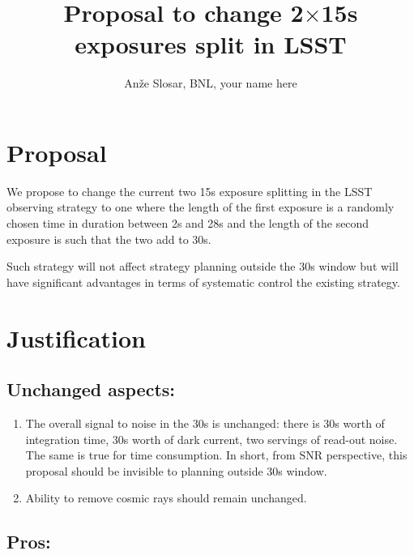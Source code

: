 \documentclass[12pt, a4paper]{article}
\begin{document}
\title{Proposal to change 2$\times$15s exposures split in LSST}
\author{An\v{z}e Slosar, BNL, your name here}
\maketitle

\section*{Proposal}

We propose to change the current two 15s exposure splitting in the
LSST observing strategy to one where the length of the first exposure
is a randomly chosen time in duration between 2s and 28s and the
length of the second exposure is such that the two add to  30s.

Such strategy will not affect strategy planning outside the 30s window
but will have significant advantages in terms of systematic control
the existing strategy.

\section*{Justification}

\subsection*{Unchanged aspects:}
\begin{enumerate}

\item The overall signal to noise in the 30s is unchanged: there is
  30s worth of integration time, 30s worth of dark current, two servings
  of read-out noise. The same is true for time consumption. In short,
  from SNR perspective, this proposal should be invisible to planning
  outside 30s window.

\item Ability to remove cosmic rays should remain unchanged.
\end{enumerate}
\subsection*{Pros:}
\end{document}
